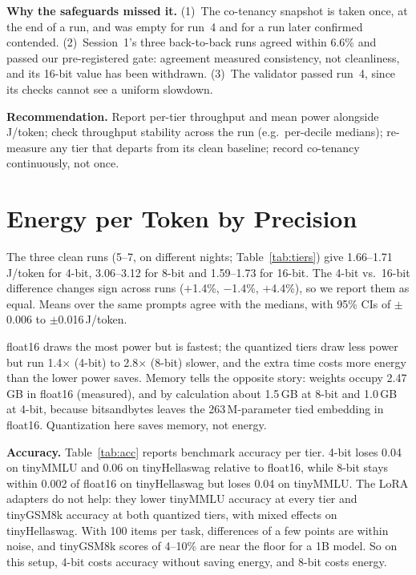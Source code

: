 \documentclass[conference]{IEEEtran}
\begin{document}
\textbf{Why the safeguards missed it.} (1)~The co-tenancy snapshot is taken once, at the end of a run, and was empty for run~4 and for a run later confirmed contended. (2)~Session~1's three back-to-back runs agreed within 6.6\% and passed our pre-registered gate: agreement measured consistency, not cleanliness, and its 16-bit value has been withdrawn. (3)~The validator passed run~4, since its checks cannot see a uniform slowdown.

\textbf{Recommendation.} Report per-tier throughput and mean power alongside J/token; check throughput stability across the run (e.g.\ per-decile medians); re-measure any tier that departs from its clean baseline; record co-tenancy continuously, not once.

\section{Energy per Token by Precision}
\label{sec:results}
The three clean runs (5--7, on different nights; Table~\ref{tab:tiers}) give 1.66--1.71\,J/token for 4-bit, 3.06--3.12 for 8-bit and 1.59--1.73 for 16-bit. The 4-bit vs.\ 16-bit difference changes sign across runs ($+$1.4\%, $-$1.4\%, $+$4.4\%), so we report them as equal. Means over the same prompts agree with the medians, with 95\% CIs of $\pm$0.006 to $\pm$0.016\,J/token.

float16 draws the most power but is fastest; the quantized tiers draw less power but run 1.4$\times$ (4-bit) to 2.8$\times$ (8-bit) slower, and the extra time costs more energy than the lower power saves. Memory tells the opposite story: weights occupy 2.47\,GB in float16 (measured), and by calculation about 1.5\,GB at 8-bit and 1.0\,GB at 4-bit, because bitsandbytes leaves the 263\,M-parameter tied embedding in float16. Quantization here saves memory, not energy.

\textbf{Accuracy.} Table~\ref{tab:acc} reports benchmark accuracy per tier. 4-bit loses 0.04 on tinyMMLU and 0.06 on tinyHellaswag relative to float16, while 8-bit stays within 0.002 of float16 on tinyHellaswag but loses 0.04 on tinyMMLU. The LoRA adapters do not help: they lower tinyMMLU accuracy at every tier and tinyGSM8k accuracy at both quantized tiers, with mixed effects on tinyHellaswag. With 100 items per task, differences of a few points are within noise, and tinyGSM8k scores of 4--10\% are near the floor for a 1B model. So on this setup, 4-bit costs accuracy without saving energy, and 8-bit costs energy.
\end{document}
